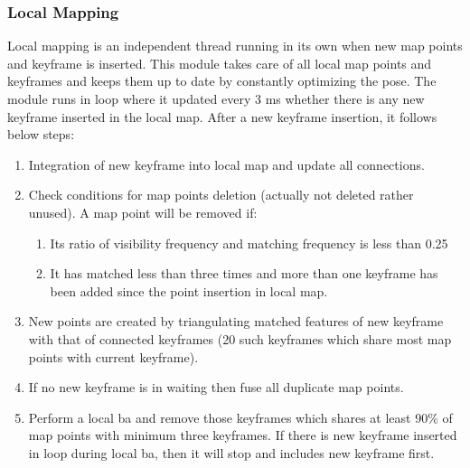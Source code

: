 \subsubsection{Local Mapping} 
Local mapping is an independent thread running in its own when new map points and keyframe is inserted. This module takes care of all local map points and keyframes and keeps them up to date by constantly optimizing the pose. The module runs in loop where it updated every 3 ms whether there is any new keyframe inserted in the local map. After a new keyframe insertion, it follows below steps: 
\begin{enumerate}
	\item Integration of new keyframe into local map and update all connections. 
	\item Check conditions for map points deletion (actually not deleted rather unused). A map point will be removed if: 
	   \begin{enumerate}
		\item Its ratio of visibility frequency and matching frequency is less than 0.25
		\item It has matched less than three times and more than one keyframe has been added since the point insertion in local map.
	   \end{enumerate}
	\item New points are created by triangulating matched features of new keyframe with that of connected keyframes (20 such keyframes which share most map points with current keyframe).  
	\item If no new keyframe is in waiting then fuse all duplicate map points.
	\item Perform a local \acrshort{ba} and remove those keyframes which shares at least 90\% of map points with minimum three keyframes. If there is new keyframe inserted in loop during local \acrshort{ba}, then it will stop and includes new keyframe first.
\end{enumerate}

